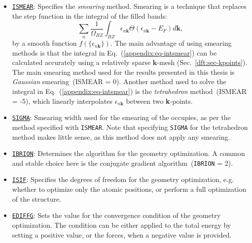 \begin{refsection}
\begin{itemize}
 \label{appendix:sec-ISMEAR} 
\item \href{https://cms.mpi.univie.ac.at/wiki/index.php/ISMEAR}{\texttt{ISMEAR}}: 
Specifies the \textit{smearing} method. Smearing is a technique that replaces the 
step function in the integral of the filled bands: 
\begin{equation}\label{appendix:eq-intsmear} 
\sum_n \frac{1}{\Omega_{BZ}}\int_{BZ} \epsilon_{n\mathbf{k}} 
\Theta(\epsilon_{n\mathbf{k}} - E_F) d\mathbf{k}, 
\end{equation} 
by a smooth function $f(\{\epsilon_{n\mathbf{k}}\})$. The main advantage of 
using smearing methods is that the integral in Eq.~(\ref{appendix:eq-intsmear}) can be 
calculated accurately using a relatively sparse $\mathbf{k}$-mesh 
(Sec.~\ref{dft:sec-kpoints}). The main smearing method used for the results 
presented in this thesis is \textit{Gaussian} smearing~\tocite (ISMEAR 
= 0). Another method used to solve the integral in Eq.~(\ref{appendix:eq-intsmear}) is 
the \textit{tetrahedron} method~\tocite (ISMEAR = -5), which 
linearly interpolates $\epsilon_{n\mathbf{k}}$ between two \textbf{k}-points. 
 
 \label{appendix:sec-SIGMA} 
\item \href{https://cms.mpi.univie.ac.at/wiki/index.php/SIGMA}{\texttt{SIGMA}}: 
Smearing width used for the smearing of the occupies, as per the method 
specified with \texttt{ISMEAR}. Note that specifying \texttt{SIGMA} for 
the tetrahedron method makes little sense, as this method does not apply any 
smearing.

 \label{appendix:sec-IBRION} 
\item \href{https://cms.mpi.univie.ac.at/wiki/index.php/ISIF}{\texttt{IBRION}}: 
Determines the algorithm for the geometry optimization. A common and stable 
choice here is the conjugate gradient algorithm~\tocite (\texttt{IBRION} = 2). 

 \label{appendix:sec-ISIF} 
\item \href{https://cms.mpi.univie.ac.at/wiki/index.php/ISIF}{\texttt{ISIF}}: 
Specifies the degrees of freedom for the geometry optimization, e.g. whether to 
optimize only the atomic positions, or perform a full optimization of the 
structure.

 \label{appendix:sec-EDIFFG} 
\item \href{https://cms.mpi.univie.ac.at/wiki/index.php/EDIFFG}{\texttt{EDIFFG}}: 
Sets the value for the convergence condition of the geometry optimization. The 
condition can be either applied to the total energy by setting a positive value, 
or the forces, when a negative value is provided.
 

\end{itemize}
\end{refsection}
